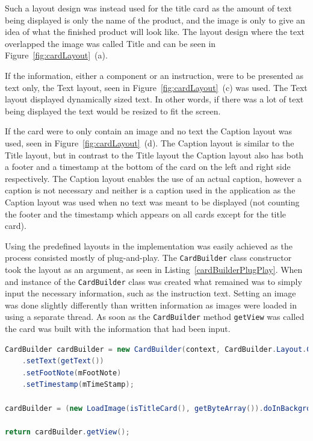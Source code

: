 Such a layout design was instead used for the title card as the amount of text being displayed is only the name of the product, and the image is only to give an idea of what the finished product will look like. The layout design where the text overlapped the image was called Title and can be seen in Figure~\ref{fig:cardLayout}~(a).

If the information, either a component or an instruction, were to be presented as text only, the Text layout, seen in Figure~\ref{fig:cardLayout}~(c) was used. The Text layout displayed dynamically sized text. In other words, if there was a lot of text being displayed the text would be resized to fit the screen.

If the card were to only contain an image and no text the Caption layout was used, seen in Figure~\ref{fig:cardLayout}~(d). The Caption layout is similar to the Title layout, but in contrast to the Title layout the Caption layout also has both a footer and a timestamp at the bottom of the card on the left and right side respectively. The Caption layout enables the use of an actual caption, however a caption is not necessary and neither is a caption used in the application as the Caption layout was used when no text was meant to be displayed (not counting the footer and the timestamp which appears on all cards except for the title card).

Using the predefined layouts in the implementation was easily achieved as the process consisted mostly of plug-and-play. The \texttt{CardBuilder} class constructor took the layout as an argument, as seen in Listing~\ref{cardBuilderPlugPlay}. When and instance of the \texttt{CardBuilder} class was created what remained was to simply input the necessary information, such as the instruction text. Setting an image was done slightly differently than written information as images were loaded in using a separate thread. As soon as the \texttt{CardBuilder} method \texttt{getView} was called the card was built with the information that had been input.

\begin{lstlisting}[language=Java, caption={Initialisation of the CardBuilder class}, label=cardBuilderPlugPlay]
CardBuilder cardBuilder = new CardBuilder(context, CardBuilder.Layout.COLUMNS)
	.setText(getText())
	.setFootNote(mFootNote)
	.setTimestamp(mTimeStamp);

cardBuilder = (new LoadImage(isTitleCard(), getByteArray()).doInBackground(cardBuilder));

return cardBuilder.getView();
\end{lstlisting}

